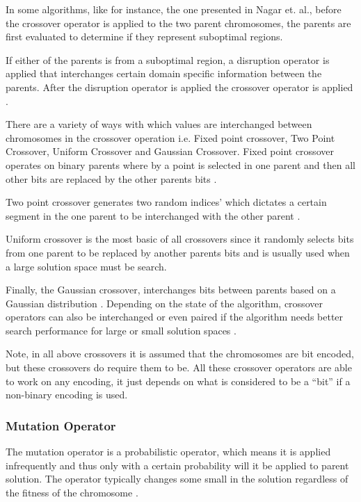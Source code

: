 In some algorithms, like for instance, the one presented in Nagar et. al., before the crossover operator is applied to the two parent chromosomes, the parents are first evaluated to determine if they represent suboptimal regions\cite{CombinedBranchBoundGA}.

If either of the parents is from a suboptimal region, a disruption operator is applied that interchanges certain domain specific information between the parents. After the disruption operator is applied the crossover operator is applied \cite{CombinedBranchBoundGA}.

There are a variety of ways with which values are interchanged between chromosomes in the crossover operation i.e. Fixed point crossover, Two Point Crossover, Uniform Crossover and Gaussian Crossover. Fixed point crossover operates on binary parents where by a point is selected in one parent and then all other bits are replaced by the other parents bits \cite{HumanPassiveGA}. 

Two point crossover generates two random indices' which dictates a certain segment in the one parent to be interchanged with the other parent \cite{ConstrainedGA}. 

Uniform crossover is the most basic of all crossovers since it randomly selects bits from one parent to be replaced by another parents bits and is usually used when a large solution space must be search\cite{ParallelGASA,GeostatisticalGA}. 

Finally, the Gaussian crossover, interchanges bits between parents based on a Gaussian distribution \cite{ParallelGASA,GeostatisticalGA}. Depending on the state of the algorithm, crossover operators can also be interchanged or even paired if the algorithm needs better search performance for large or small solution spaces \cite{HetergeneousGA,ParallelGASA}.

Note, in all above crossovers it is assumed that the chromosomes are bit encoded, but these crossovers do require them to be. All these crossover operators are able to work on any encoding, it just depends on what is considered to be a ``bit'' if a non-binary encoding is used. 

\subsubsection{Mutation Operator}
The mutation operator is a probabilistic operator, which means it is applied infrequently and thus only with a certain probability will it be applied to parent solution. The operator typically changes some small in the solution regardless of the fitness of the chromosome \cite{HybridBaldwinGA,HumanPassiveGA}.


